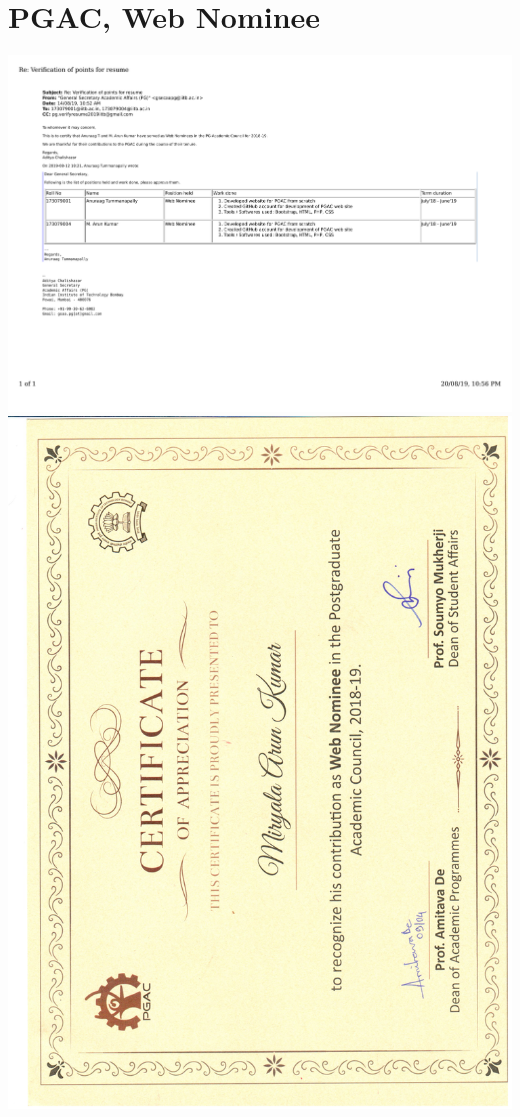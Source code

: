 \documentclass{article}
\begin{document}
\section{ PGAC, Web Nominee}
	\includegraphics[page=1, scale=0.5]{proofs/pgac.pdf}\\
	\newpage
	\includegraphics[page=1, scale=0.5]{proofs/web_nominee.pdf}
\end{document}
